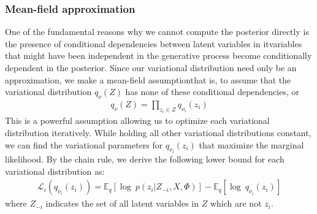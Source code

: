 \documentclass[12pt,letterpaper]{article}
\begin{document}
\subsubsection{Mean-field approximation} 
One of the fundamental reasons why we cannot compute the posterior directly is the presence of conditional dependencies between latent variables in it\textemdash variables that might have been independent in the generative process become conditionally dependent in the posterior. Since our variational distribution need only be an approximation, we make a mean-field assumption\textemdash that is, to assume that the variational distribution $q_{\nu}(Z)$ has none of these conditional dependencies, or 
\begin{align} \nonumber q_{\nu}(Z) = \prod\limits_{z_i 
\in Z} q_{\nu_i}(z_i) \end{align}
This is a powerful assumption allowing us to optimize each variational distribution iteratively. While holding all other variational distributions constant, we can find the variational parameters for $q_{\nu_i}(z_i)$ that maximize the marginal likelihood. By the chain rule, we derive the following lower bound for each variational distribution as:
\begin{align}
\mathcal{L}_i(q_{\nu_i}(z_i)) = \mathbb{E}_q[\log\ p(z_i| Z_{-i}, X, \Phi)] - \mathbb{E}_q[\log\ q_{\nu_i}(z_i)]
\end{align} 
where $Z_{-i}$ indicates the set of all latent variables in $Z$ which are not $z_i$. 
\end{document}
